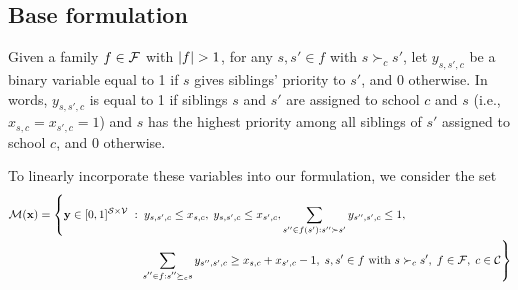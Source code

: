     \subsection{Base formulation}
        Given a family \(f\in \mathcal{F}\) with \(\left|f\right| >1\), for any \(s,s'\in f\) with \(s\succ_c s'\), let \(y_{s,s',c}\) be a binary variable equal to 1 if \(s\) gives siblings' priority to \(s'\), and 0 otherwise. In words, \(y_{s,s',c}\) is equal to 1 if siblings \(s\) and \(s'\) are assigned to school \(c\) and \(s\) (i.e., \(x_{s,c} = x_{s',c}=1\)) and \(s\) has the highest priority among all siblings of \(s'\) assigned to school \(c\), and 0 otherwise.

        To linearly incorporate these variables into our formulation, we consider the set
        \[
        \begin{split}
        \cM(\mathbf{x}) &= \left\{ \mathbf{y} \in [0,1]^{\cS\times \cV} \;:\;  y_{s,s',c} \leq x_{s,c}, \; y_{s,s',c} \leq x_{s',c},
                                  \sum_{s''\in f(s'): s''\succ s'} y_{s'',s',c} \leq 1, \right. \\
          &\hspace{3cm} \left. \; \sum_{\substack{s''\in f:s'' \succeq_c s}} y_{s'',s',c} \geq x_{s,c} + x_{s',c} - 1,\; s,s' \in f \text{ with } s\succ_c s', \; f\in \cF, \; c\in \cC  \right\}
        \end{split}
        \]


